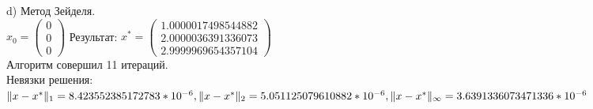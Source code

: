 \documentclass{article}
\begin{document}
	d) Метод Зейделя.\\ $x_0 = \left( \begin{array}{c} 0\\ 0\\ 0 \end{array} \right)$ Результат: $x^* = \left( \begin{array}{c} 1.0000017498544882\\ 2.0000036391336073\\2.9999969654357104\end{array} \right)$ \\
	Алгоритм совершил 11 итераций.\\
	Невязки решения:\\ $\Vert x - x^* \Vert_1 = 8.423552385172783*10^{-6},\\ \Vert x - x^* \Vert_2 = 5.051125079610882*10^{-6},\\ \Vert x - x^* \Vert_\infty = 3.6391336073471336*10^{-6}$	\\
\end{document}
